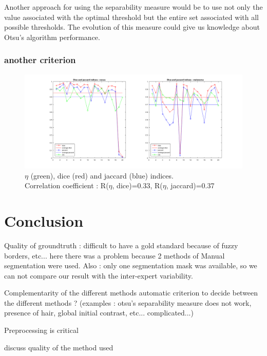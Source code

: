 \documentclass[a4paper,10pt]{article}
\begin{document}
Another approach for using the separability measure would be to use not only the value associated with the optimal threshold but the entire set associated with all possible thresholds. The evolution of this measure could give us knowledge about Otsu's algorithm performance.

\subsubsection{another criterion}

\begin{figure}
\centering
\includegraphics[width=0.9\linewidth]{../results/otsu-dice-jaccard-eta-plot}
\caption{$\eta$ (green), dice (red) and jaccard (blue) indices.\\ Correlation coefficient : R($\eta$, dice)=0.33, R($\eta$, jaccard)=0.37 }
\label{fig:eta-correlation}
\end{figure}


\section*{Conclusion}
 Quality of groundtruth : difficult to have a gold standard because of fuzzy borders, etc... here there was a problem because 2 methods of Manual segmentation were used. Also : only one segmentation mask was available, so we can not compare our result with the inter-expert variability.

 Complementarity of the different methods
 automatic criterion to decide between the different methods ? (examples : otsu's separability measure does not work, presence of hair, global initial contrast, etc... complicated...)
 
 Preprocessing is critical
 
discuss quality of the method used





\end{document}

